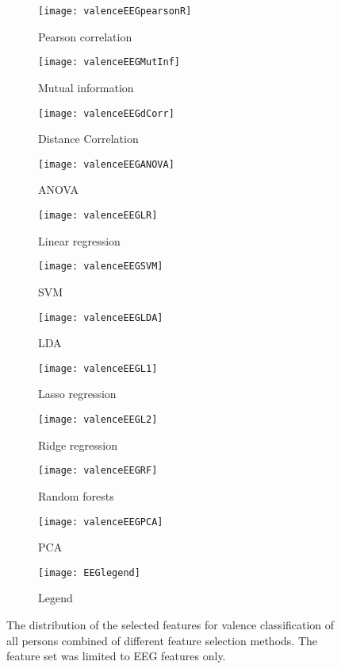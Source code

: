\clearpage

\begin{figure}[!tbp]
  \centering
  \begin{subfigure}[b]{0.3\textwidth}
    \texttt{[image: valenceEEGpearsonR]}
    \caption{Pearson correlation}
  \end{subfigure}
  \hfill
  \begin{subfigure}[b]{0.3\textwidth}
    \texttt{[image: valenceEEGMutInf]}
    \caption{Mutual information}
  \end{subfigure}
  \hfill
  \begin{subfigure}[b]{0.3\textwidth}
    \texttt{[image: valenceEEGdCorr]}
    \caption{Distance Correlation}
  \end{subfigure}
  
  \begin{subfigure}[b]{0.3\textwidth}
    \texttt{[image: valenceEEGANOVA]}
    \caption{ANOVA}
  \end{subfigure}
  \hfill
  \begin{subfigure}[b]{0.3\textwidth}
    \texttt{[image: valenceEEGLR]}
    \caption{Linear regression}
  \end{subfigure}
  \hfill
  \begin{subfigure}[b]{0.3\textwidth}
    \texttt{[image: valenceEEGSVM]}
    \caption{SVM}
  \end{subfigure}
  
  \begin{subfigure}[b]{0.3\textwidth}
    \texttt{[image: valenceEEGLDA]}
    \caption{LDA}
  \end{subfigure}
  \hfill
  \begin{subfigure}[b]{0.3\textwidth}
    \texttt{[image: valenceEEGL1]}
    \caption{Lasso regression}
  \end{subfigure}
  \hfill
  \begin{subfigure}[b]{0.3\textwidth}
    \texttt{[image: valenceEEGL2]}
    \caption{Ridge regression}
  \end{subfigure}
  
  \begin{subfigure}[b]{0.3\textwidth}
    \texttt{[image: valenceEEGRF]}
    \caption{Random forests}
  \end{subfigure}
  \hfill
  \begin{subfigure}[b]{0.3\textwidth}
    \texttt{[image: valenceEEGPCA]}
    \caption{PCA}
  \end{subfigure}
  \hfill
  \begin{subfigure}[b]{0.3\textwidth}
    \texttt{[image: EEGlegend]}
    \caption{Legend\label{valencepiesEEGlegend}}
  \end{subfigure}
  \caption{The distribution of the selected features for valence classification of all persons combined of different feature selection methods. The feature set was limited to EEG features only.\label{valenceEEGpies}}
\end{figure}
\clearpage


